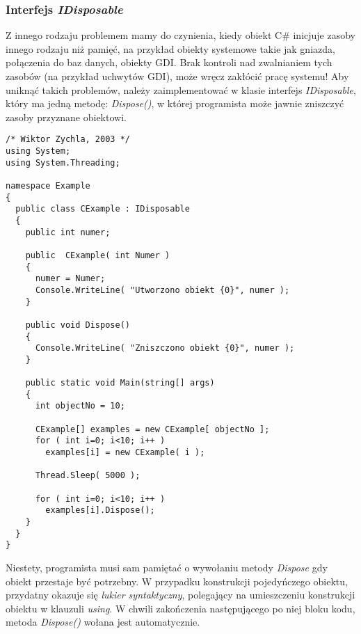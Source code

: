 \subsubsection{Interfejs {\em IDisposable}}

Z innego rodzaju problemem mamy do czynienia, kiedy obiekt C\# inicjuje zasoby innego 
rodzaju niż pamięć, na przykład obiekty systemowe takie jak gniazda, połączenia do baz danych, obiekty GDI.
Brak kontroli nad zwalnianiem tych zasobów (na przykład uchwytów GDI), może wręcz zakłócić pracę systemu!
Aby uniknąć takich problemów, należy zaimplementować w klasie interfejs {\em IDisposable}, który ma
jedną metodę: {\em Dispose()}, w której programista może jawnie zniszczyć zasoby przyznane obiektowi.

\begin{scriptsize}
\begin{verbatim}
/* Wiktor Zychla, 2003 */
using System;
using System.Threading;

namespace Example
{
  public class CExample : IDisposable
  {
    public int numer;

    public  CExample( int Numer )
    {
      numer = Numer;
      Console.WriteLine( "Utworzono obiekt {0}", numer );
    }

    public void Dispose()
    {
      Console.WriteLine( "Zniszczono obiekt {0}", numer );
    }

    public static void Main(string[] args)
    {
      int objectNo = 10;
      
      CExample[] examples = new CExample[ objectNo ];
      for ( int i=0; i<10; i++ )
        examples[i] = new CExample( i ); 

      Thread.Sleep( 5000 );

      for ( int i=0; i<10; i++ )
        examples[i].Dispose(); 
    }
  }
}
\end{verbatim}
\end{scriptsize}

Niestety, programista musi sam pamiętać o wywołaniu metody {\em Dispose} gdy obiekt przestaje być potrzebny.
W przypadku konstrukcji pojedyńczego obiektu, przydatny okazuje się {\em lukier syntaktyczny}, polegający
na umieszczeniu konstrukcji obiektu w klauzuli {\em using}. W chwili zakończenia następującego po niej
bloku kodu, metoda {\em Dispose()} wołana jest automatycznie.

\label{disposeSyntaxSugar}

